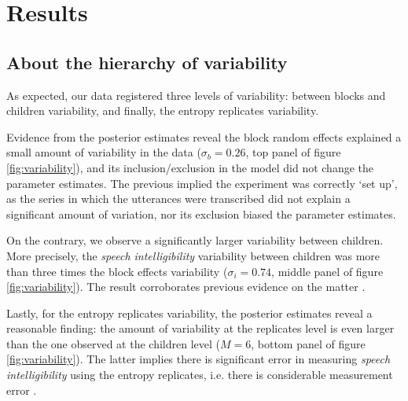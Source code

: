 \section{Results} \label{S:results}
%
\subsection{About the hierarchy of variability} \label{sS:results_variability}
%
As expected, our data registered three levels of variability: between blocks and children variability, and finally, the entropy replicates variability.

Evidence from the posterior estimates reveal the block random effects explained a small amount of variability in the data ($\sigma_{b}=0.26$, top panel of figure \ref{fig:variability}), and its inclusion/exclusion in the model did not change the parameter estimates. The previous implied the experiment was correctly `set up', as the series in which the utterances were transcribed did not explain a significant amount of variation, nor its exclusion biased the parameter estimates.

On the contrary, we observe a significantly larger variability between children. More precisely, the \textit{speech intelligibility} variability between children was more than three times the block effects variability ($\sigma_{i}=0.74$, middle panel of figure \ref{fig:variability}). The result corroborates previous evidence on the matter \cite{Young_et_al_2002, Peng_et_al_2004, Montag_et_al_2014, Castellanos_et_al_2014, Yanbay_et_al_2014, Nittrouer_et_al_2014, Freeman_et_al_2017, Boonen_et_al_2021}. 

Lastly, for the entropy replicates variability, the posterior estimates reveal a reasonable finding: the amount of variability at the replicates level is even larger than the one observed at the children level ($M=6$, bottom panel of figure \ref{fig:variability}). The latter implies there is significant error in measuring \textit{speech intelligibility} using the entropy replicates, i.e. there is considerable measurement error \cite{Carroll_2006}.

